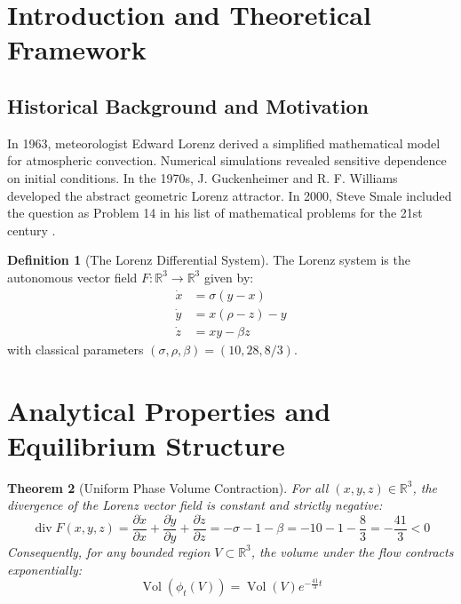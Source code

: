\documentclass[11pt,a4paper]{article}
\newtheorem{theorem}{Theorem}[section]
\theoremstyle{definition}
\newtheorem{definition}[theorem]{Definition}
\begin{document}
\tableofcontents
\newpage

\section{Introduction and Theoretical Framework}

\subsection{Historical Background and Motivation}
In 1963, meteorologist Edward Lorenz \cite{lorenz1963} derived a simplified mathematical model for atmospheric convection.
Numerical simulations revealed sensitive dependence on initial conditions.
In the 1970s, J. Guckenheimer and R. F. Williams \cite{guckenheimer_williams1979} developed the abstract geometric Lorenz attractor.
In 2000, Steve Smale included the question as Problem 14 in his list of mathematical problems for the 21st century \cite{smale2000}.

\begin{definition}[The Lorenz Differential System]\label{def:lorenz_system}
The Lorenz system is the autonomous vector field $F : \mathbb{R}^3 \to \mathbb{R}^3$ given by:
\begin{align}
\dot{x} &= \sigma (y - x) \label{eq:lorenz_x} \\
\dot{y} &= x (\rho - z) - y \label{eq:lorenz_y} \\
\dot{z} &= x y - \beta z \label{eq:lorenz_z}
\end{align}
with classical parameters $(\sigma, \rho, \beta) = (10, 28, 8/3)$.
\end{definition}

\section{Analytical Properties and Equilibrium Structure}

\begin{theorem}[Uniform Phase Volume Contraction]\label{thm:lorenz_div}
For all $(x, y, z) \in \mathbb{R}^3$, the divergence of the Lorenz vector field is constant and strictly negative:
\begin{equation}\label{eq:lorenz_div_exact}
\operatorname{div} F(x, y, z) = \frac{\partial \dot{x}}{\partial x} + \frac{\partial \dot{y}}{\partial y} + \frac{\partial \dot{z}}{\partial z} = -\sigma - 1 - \beta = -10 - 1 - \frac{8}{3} = -\frac{41}{3} < 0
\end{equation}
Consequently, for any bounded region $V \subset \mathbb{R}^3$, the volume under the flow contracts exponentially:
\[ \operatorname{Vol}(\phi_t(V)) = \operatorname{Vol}(V) e^{-\frac{41}{3} t} \]
\end{theorem}
\end{document}
